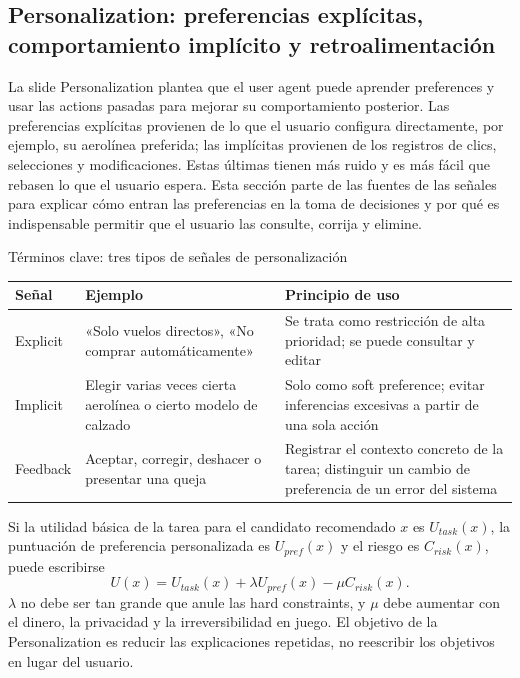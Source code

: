 \subsection{Personalization: preferencias explícitas, comportamiento implícito y retroalimentación}

La slide Personalization plantea que el user agent puede aprender preferences y usar las actions pasadas para mejorar su comportamiento posterior. Las preferencias explícitas provienen de lo que el usuario configura directamente, por ejemplo, su aerolínea preferida; las implícitas provienen de los registros de clics, selecciones y modificaciones. Estas últimas tienen más ruido y es más fácil que rebasen lo que el usuario espera. Esta sección parte de las fuentes de las señales para explicar cómo entran las preferencias en la toma de decisiones y por qué es indispensable permitir que el usuario las consulte, corrija y elimine.


\begin{knowledgebox}{Términos clave: tres tipos de señales de personalización}
\begin{tabularx}{\textwidth}{L{0.18\textwidth}X X}
\toprule
Señal & Ejemplo & Principio de uso \\
\midrule
Explicit & «Solo vuelos directos», «No comprar automáticamente» & Se trata como restricción de alta prioridad; se puede consultar y editar \\
Implicit & Elegir varias veces cierta aerolínea o cierto modelo de calzado & Solo como soft preference; evitar inferencias excesivas a partir de una sola acción \\
Feedback & Aceptar, corregir, deshacer o presentar una queja & Registrar el contexto concreto de la tarea; distinguir un cambio de preferencia de un error del sistema \\
\bottomrule
\end{tabularx}
\end{knowledgebox}

Si la utilidad básica de la tarea para el candidato recomendado $x$ es $U_{task}(x)$, la puntuación de preferencia personalizada es $U_{pref}(x)$ y el riesgo es $C_{risk}(x)$, puede escribirse
\[
U(x)=U_{task}(x)+\lambda U_{pref}(x)-\mu C_{risk}(x).
\]
$\lambda$ no debe ser tan grande que anule las hard constraints, y $\mu$ debe aumentar con el dinero, la privacidad y la irreversibilidad en juego. El objetivo de la Personalization es reducir las explicaciones repetidas, no reescribir los objetivos en lugar del usuario.

